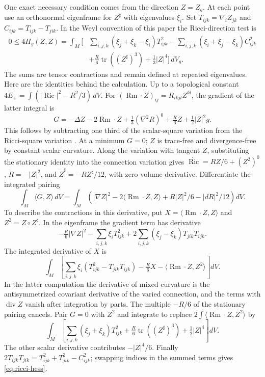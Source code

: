 \documentclass[11pt,letterpaper]{article}
\numberwithin{equation}{section}
\theoremstyle{remark}
\DeclareMathOperator{\Ric}{Ric}
\DeclareMathOperator{\Rm}{Rm}
\begin{document}
One exact necessary condition comes from the direction \(Z=Z_g\).
At each point use an orthonormal eigenframe for \(Z^\sharp\)
with eigenvalues \(\xi_i\). Set \(T_{ijk}=\nabla_iZ_{jk}\) and
\(C_{ijk}=T_{ijk}-T_{jik}\). In the Weyl convention of this
paper the Ricci-direction test is
\begin{equation}\label{eq:ricci-hess}
\begin{split}
0\le4H_g(Z,Z)=\int_M\Big[
 &\sum_{i,j,k}(\xi_j+\xi_k-\xi_i)T_{ijk}^2
  -\sum_{i,j,k}(\xi_i+\xi_j-\xi_k)C_{ijk}^2\\
 &+\frac R6\operatorname{tr}((Z^\sharp)^3)
   +\frac13|Z|^4\Big]\,dV_g .
\end{split}
\end{equation}
The sums are tensor contractions and remain defined at repeated
eigenvalues. Here are the identities behind the calculation.
Up to a topological constant \(4E_+=\int(|\Ric|^2-R^2/3)\,dV\).
For \((\Rm\cdot Z)_{ij}=R_{ikjl}Z^{kl}\), the gradient of the
latter integral is
\[
 G=-\Delta Z-2\Rm\cdot Z+\tfrac13(\nabla^2R)^0+
          \tfrac R6Z+\tfrac12|Z|^2g .
\]
This follows by subtracting one third of the scalar-square
variation from the Ricci-square variation
\cite[\S2]{GurskyViaclovsky2015}. At a minimum \(G=0\);
\(Z\) is trace-free and divergence-free by constant scalar
curvature. Along the variation with tangent \(Z\), substituting
the stationary identity into the connection variation gives
\(\dot{\Ric}=RZ/6+(Z^2)^0\),
\(\dot R=-|Z|^2\), and
\(\dot Z^\sharp=-RZ^\sharp/12\), with zero volume derivative.
Differentiate the integrated pairing
\[
 \int_M\langle G,Z\rangle\,dV=
 \int_M\left(|\nabla Z|^2-2\langle\Rm\cdot Z,Z\rangle+
                  R|Z|^2/6-|dR|^2/12\right)dV .
\]
To describe the contractions in this derivative, put
\(X=\langle\Rm\cdot Z,Z\rangle\) and \(Z^2=Z\circ Z^\sharp\).
In the eigenframe the gradient term has derivative
\[
 -\tfrac R6|\nabla Z|^2
 -\sum_{i,j,k}\xi_i T_{ijk}^2
 +2\sum_{i,j,k}(\xi_j-\xi_k) T_{jik}T_{ijk}.
\]
The integrated derivative of \(X\) is
\[
 \int_M\left[\sum_{i,j,k}\xi_i(T_{ijk}^2-T_{jik}T_{ijk})
 -\tfrac R6 X-\langle\Rm\cdot Z,Z^2\rangle\right]dV .
\]
In the latter computation the derivative of mixed curvature
is the antisymmetrized covariant derivative of the varied
connection, and the terms with \(\operatorname{div} Z\) vanish
after integration by parts. The multiple \(-R/6\) of the
stationary pairing cancels. Pair \(G=0\) with \(Z^2\) and
integrate to replace \(2\int\langle\Rm\cdot Z,Z^2\rangle\) by
\[
 \int_M\left[\sum_{i,j,k}(\xi_j+\xi_k)T_{ijk}^2+
             \tfrac R6\operatorname{tr}((Z^\sharp)^3)+
             \tfrac12|Z|^4\right]dV .
\]
The other scalar derivative contributes \(-|Z|^4/6\). Finally
\(2T_{ijk}T_{jik}=T_{ijk}^2+T_{jik}^2-C_{ijk}^2\);
swapping indices in the summed terms gives \eqref{eq:ricci-hess}.
\end{document}
